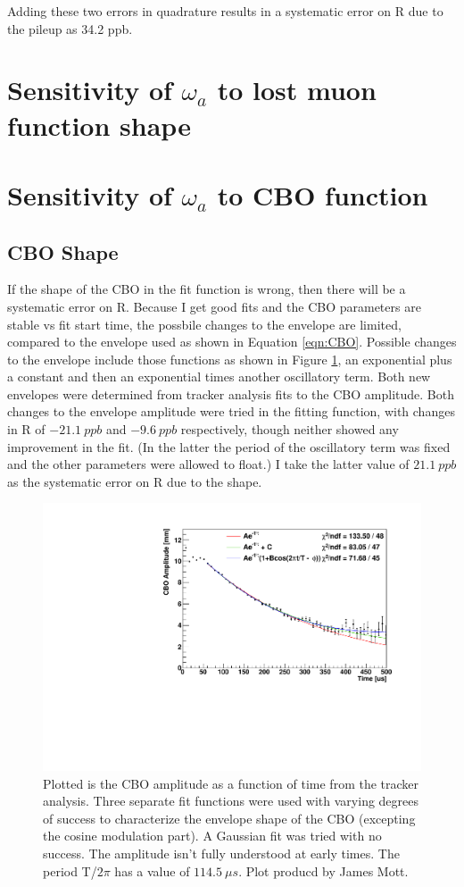 	Adding these two errors in quadrature results in a systematic error on R due to the pileup as 34.2 ppb.



\section{Sensitivity of \texorpdfstring{$\omega_{a}$}{} to lost muon function shape}

\section{Sensitivity of \texorpdfstring{$\omega_{a}$}{} to CBO function}

	\subsection{CBO Shape}

		If the shape of the CBO in the fit function is wrong, then there will be a systematic error on R. Because I get good fits and the CBO parameters are stable vs fit start time, the possbile changes to the envelope are limited, compared to the envelope used as shown in Equation \ref{eqn:CBO}. Possible changes to the envelope include those functions as shown in Figure \ref{fig:CBOShapeAmplitude}, an exponential plus a constant and then an exponential times another oscillatory term. Both new envelopes were determined from tracker analysis fits to the CBO amplitude. Both changes to the envelope amplitude were tried in the fitting function, with changes in R of $\SI{-21.1}{ppb}$ and $\SI{-9.6}{ppb}$ respectively, though neither showed any improvement in the fit. (In the latter the period of the oscillatory term was fixed and the other parameters were allowed to float.) I take the latter value of $\SI{21.1}{ppb}$ as the systematic error on R due to the shape.

		\begin{figure}[]
			\centering
			\includegraphics[width=.7\textwidth]{AmplFitOptions}
		    \caption[CBOShapeAmplitude]{Plotted is the CBO amplitude as a function of time from the tracker analysis. Three separate fit functions were used with varying degrees of success to characterize the envelope shape of the CBO (excepting the cosine modulation part). A Gaussian fit was tried with no success. The amplitude isn't fully understood at early times. The period T/$2\pi$ has a value of $\SI{114.5}{\mu s}$. Plot producd by James Mott.}
		    \label{fig:CBOShapeAmplitude}
		\end{figure}

